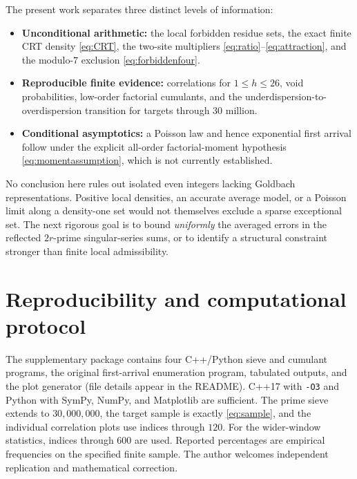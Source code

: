 \documentclass[11pt,a4paper]{article}
\theoremstyle{definition}
\begin{document}
The present work separates three distinct levels of information:
\begin{itemize}
\item \textbf{Unconditional arithmetic:} the local forbidden residue sets, the exact finite CRT density \eqref{eq:CRT}, the two-site multipliers \eqref{eq:ratio}--\eqref{eq:attraction}, and the modulo-$7$ exclusion \eqref{eq:forbiddenfour}.
\item \textbf{Reproducible finite evidence:} correlations for $1\le h\le26$, void probabilities, low-order factorial cumulants, and the underdispersion-to-overdispersion transition for targets through $30$ million.
\item \textbf{Conditional asymptotics:} a Poisson law and hence exponential first arrival follow under the explicit all-order factorial-moment hypothesis \eqref{eq:momentassumption}, which is not currently established.
\end{itemize}
No conclusion here rules out isolated even integers lacking Goldbach representations.  Positive local densities, an accurate average model, or a Poisson limit along a density-one set would not themselves exclude a sparse exceptional set.  The next rigorous goal is to bound \emph{uniformly} the averaged errors in the reflected $2r$-prime singular-series sums, or to identify a structural constraint stronger than finite local admissibility.

\section*{Reproducibility and computational protocol}
The supplementary package contains four C++/Python sieve and cumulant programs, the original first-arrival enumeration program, tabulated outputs, and the plot generator (file details appear in the README). C++17 with \texttt{-O3} and Python with SymPy, NumPy, and Matplotlib are sufficient.  The prime sieve extends to $30{,}000{,}000$, the target sample is exactly \eqref{eq:sample}, and the individual correlation plots use indices through $120$.  For the wider-window statistics, indices through $600$ are used.  Reported percentages are empirical frequencies on the specified finite sample.  The author welcomes independent replication and mathematical correction.

\clearpage
\printbibliography
\end{document}

